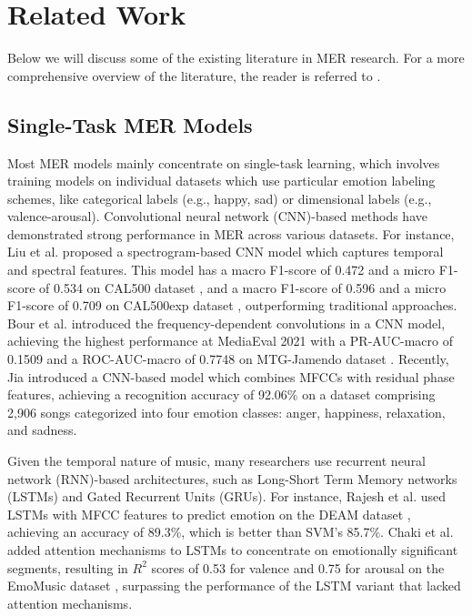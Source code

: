 \section{Related Work}
\label{sec:related}

Below we will discuss some of the existing literature in MER research. For a more comprehensive overview of the literature, the reader is referred to \cite{kang2024we, shelke2024exploring}.

\subsection{Single-Task MER Models}
Most MER models mainly concentrate on single-task learning, which involves training models on individual datasets which use particular emotion labeling schemes, like categorical labels (e.g., happy, sad) or dimensional labels (e.g., valence-arousal). Convolutional neural network (CNN)-based methods have demonstrated strong performance in MER across various datasets. For instance, Liu et al. \cite{liu2017cnn} proposed a spectrogram-based CNN model which captures temporal and spectral features. This model has a macro F1-score of 0.472 and a micro F1-score of 0.534 on CAL500 dataset \cite{turnbull2007towards}, and a macro F1-score of 0.596 and a micro F1-score of 0.709 on CAL500exp dataset \cite{wang2014towards}, outperforming traditional approaches. Bour et al. \cite{bour2021frequency} introduced the frequency-dependent convolutions in a CNN model, achieving the highest performance at MediaEval 2021 with a PR-AUC-macro of 0.1509 and a ROC-AUC-macro of 0.7748 on MTG-Jamendo dataset \cite{bogdanov2019mtg}. Recently, Jia \cite{jia2022music} introduced a CNN-based model which combines MFCCs with residual phase features, achieving a recognition accuracy of 92.06\% on a dataset comprising 2,906 songs categorized into four emotion classes: anger, happiness, relaxation, and sadness.

Given the temporal nature of music, many researchers use recurrent neural network (RNN)-based architectures, such as Long-Short Term Memory networks (LSTMs) and Gated Recurrent Units (GRUs). For instance, Rajesh et al. \cite{rajesh2020musical} used LSTMs with MFCC features to predict emotion on the DEAM dataset \cite{aljanaki2017developing}, achieving an accuracy of 89.3\%, which is better than SVM’s 85.7\%. Chaki et al. \cite{chaki2020attentive} added attention mechanisms to LSTMs to concentrate on emotionally significant segments, resulting in \(R^2\) scores of 0.53 for valence and 0.75 for arousal on the EmoMusic dataset \cite{soleymani20131000}, surpassing the performance of the LSTM variant that lacked attention mechanisms.


